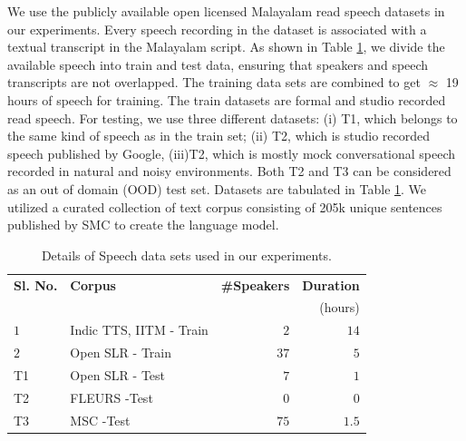 \documentclass[runningheads]{llncs}
\begin{document}
We use the publicly available open licensed Malayalam read speech datasets \cite{baby2016resources,he-etal-2020-open} in our experiments. Every speech recording in the dataset is associated with a textual transcript in the Malayalam script. As shown in Table \ref{tab:speechdatasets}, we divide the available speech into train and test data, ensuring that speakers and speech transcripts are not overlapped. The training data sets are combined to get $\approx$ 19 hours of speech for training. The train datasets are formal and studio recorded read speech. For testing, we use three different datasets: (i) T1, which belongs to the same kind of speech as in the train set; (ii) T2, which is studio recorded speech published by Google, (iii)T2, which is mostly mock conversational speech recorded in natural and noisy environments. Both T2 and T3 can be considered as an out of domain (OOD) test set. Datasets are tabulated in Table \ref{tab:speechdatasets}. We utilized a curated collection of text corpus consisting of 205k unique sentences published by SMC \cite{smctext} to create the language model. 


\begin{table}[htpb]
	\caption{Details of Speech data sets used in our experiments. }
	\label{tab:speechdatasets}
	\centering
	\begin{tabular}{llrr}
		\hline \hline
		\textbf{Sl. No.} & \textbf{Corpus}                                     & \textbf{\#Speakers} & \textbf{Duration} \\
		              &                                                     &                                           & (hours)         \\
		\hline
		$1$             & Indic TTS, IITM \cite{baby2016resources}- Train     & $2$                                    & $14$               \\
		$2$             & Open SLR  \cite{he-etal-2020-open} - Train & $37$                                  & $5$               \\ \hline
		T1            & Open SLR  \cite{he-etal-2020-open} - Test  & $7$                                   & $1$                \\
   	T2&FLEURS \cite{fleurs2022arxiv}   -Test                                                  &$0$                       & $0$  \\
		 T3&MSC \cite{smcspeech}   -Test                             & $75$                                             & $1.5$                    \\

\hline
	\end{tabular}

\end{table}
\end{document}
